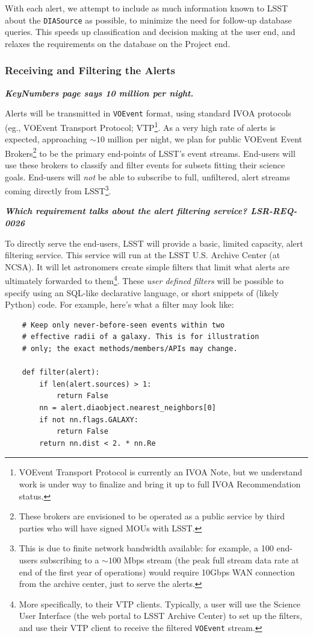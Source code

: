 \documentclass[12pt]{article}
\newcommand{\code}[1]{\texttt{#1}}
\newcommand{\annotate}[1]{{\color{magenta}\large\textbf{\emph{#1}}}}
\newcommand{\DIASource}{\code{DIASource}\xspace}
\newcommand{\VOEvent}{\code{VOEvent}\xspace}
\newcommand{\req}[1]{\marginpar{\tiny #1}}
\begin{document}
With each alert, we attempt to include as much information known to LSST about the \DIASource as possible, to minimize the need for follow-up database queries. This speeds up classification and decision making at the user end, and relaxes the requirements on the database on the Project end.

\subsubsection{Receiving and Filtering the Alerts}
\label{sec:eventbrokers}

\annotate{KeyNumbers page says 10 million per night.}

Alerts will be transmitted in \VOEvent format, using standard IVOA protocols (eg., VOEvent Transport Protocol; VTP\footnote{VOEvent Transport Protocol is currently an IVOA Note, but we understand work is under way to finalize and bring it up to full IVOA Recommendation status.}. As a very high rate of alerts is expected, approaching $\sim 10$ million per night, we plan for public VOEvent Event Brokers\footnote{These brokers are envisioned to be operated as a public service by third parties who will have signed MOUs with LSST.} to be the primary end-points of LSST's event streams. End-users will use these brokers to classify and filter events for subsets fitting their science goals. End-users will {\em not} be able to subscribe to full, unfiltered, alert streams coming directly from LSST\footnote{This is due to finite network bandwidth available: for example, a 100 end-users subscribing to a $\sim 100$ Mbps stream (the peak full stream data rate at end of the first year of operations) would require 10Gbps WAN connection from the archive center, just to serve the alerts.}.

\annotate{Which requirement talks about the alert filtering service? LSR-REQ-0026}
\req{LSR-REQ-0026}

To directly serve the end-users, LSST will provide a basic, limited capacity, alert filtering service. This service will run at the LSST U.S. Archive Center (at NCSA). It will let astronomers create simple filters that limit what alerts are ultimately forwarded to them\footnote{More specifically, to their VTP clients. Typically, a user will use the Science User Interface (the web portal to LSST Archive Center) to set up the filters, and use their VTP client to receive the filtered \VOEvent stream.}. These {\em user defined filters} will be possible to specify using an SQL-like declarative language, or short snippets of (likely Python) code. For example, here's what a filter may look like:
\begin{verbatim}
    # Keep only never-before-seen events within two
    # effective radii of a galaxy. This is for illustration
    # only; the exact methods/members/APIs may change.

    def filter(alert):
        if len(alert.sources) > 1:
            return False
        nn = alert.diaobject.nearest_neighbors[0]
        if not nn.flags.GALAXY:
            return False
        return nn.dist < 2. * nn.Re
\end{verbatim}
\end{document}
